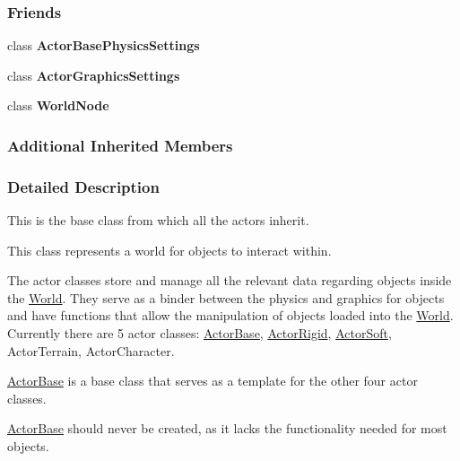 \subsubsection*{Friends}
\begin{DoxyCompactItemize}
\item 
\hypertarget{classMezzanine_1_1ActorBase_ad56afa2bffce8b552583041f21297874}{class {\bfseries Actor\-Base\-Physics\-Settings}}\label{classMezzanine_1_1ActorBase_ad56afa2bffce8b552583041f21297874}

\item 
\hypertarget{classMezzanine_1_1ActorBase_a01f5bcaf4807085e756d9c03b3eb8d9d}{class {\bfseries Actor\-Graphics\-Settings}}\label{classMezzanine_1_1ActorBase_a01f5bcaf4807085e756d9c03b3eb8d9d}

\item 
\hypertarget{classMezzanine_1_1ActorBase_a1cacd07efb11226da49a7c80569b18e8}{class {\bfseries World\-Node}}\label{classMezzanine_1_1ActorBase_a1cacd07efb11226da49a7c80569b18e8}

\end{DoxyCompactItemize}
\subsubsection*{Additional Inherited Members}


\subsubsection{Detailed Description}
This is the base class from which all the actors inherit. 

This class represents a world for objects to interact within.

The actor classes store and manage all the relevant data regarding objects inside the \hyperlink{classMezzanine_1_1World}{World}. They serve as a binder between the physics and graphics for objects and have functions that allow the manipulation of objects loaded into the \hyperlink{classMezzanine_1_1World}{World}. Currently there are 5 actor classes\-: \hyperlink{classMezzanine_1_1ActorBase}{Actor\-Base}, \hyperlink{classMezzanine_1_1ActorRigid}{Actor\-Rigid}, \hyperlink{classMezzanine_1_1ActorSoft}{Actor\-Soft}, Actor\-Terrain, Actor\-Character. \par
 \hyperlink{classMezzanine_1_1ActorBase}{Actor\-Base} is a base class that serves as a template for the other four actor classes. \par
 \hyperlink{classMezzanine_1_1ActorBase}{Actor\-Base} should never be created, as it lacks the functionality needed for most objects.

